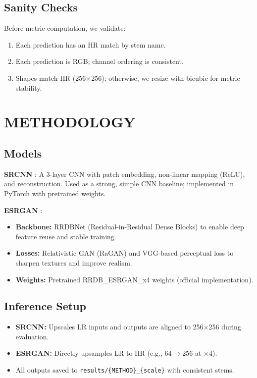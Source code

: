 \documentclass[]{spie}
\begin{document}
\subsection{Sanity Checks}
Before metric computation, we validate:
\begin{enumerate}
    \item Each prediction has an HR match by stem name.
    \item Each prediction is RGB; channel ordering is consistent.
    \item Shapes match HR (256$\times$256); otherwise, we resize with bicubic for metric stability.
\end{enumerate}

\section{METHODOLOGY}
\subsection{Models}
\textbf{SRCNN} \cite{dong2014learning}: A 3-layer CNN with patch embedding, non-linear mapping (ReLU), and reconstruction. Used as a strong, simple CNN baseline; implemented in PyTorch with pretrained weights.

\textbf{ESRGAN} \cite{wang2018esrgan}:
\begin{itemize}
    \item \textbf{Backbone:} RRDBNet (Residual-in-Residual Dense Blocks) to enable deep feature reuse and stable training.
    \item \textbf{Losses:} Relativistic GAN (RaGAN) and VGG-based perceptual loss to sharpen textures and improve realism.
    \item \textbf{Weights:} Pretrained RRDB\_ESRGAN\_x4 weights (official implementation).
\end{itemize}

\subsection{Inference Setup}
\begin{itemize}
  \item \textbf{SRCNN:} Upscales LR inputs and outputs are aligned to 256$\times$256 during evaluation.
  \item \textbf{ESRGAN:} Directly upsamples LR to HR (e.g., 64$\rightarrow$256 at $\times4$).
  \item All outputs saved to \texttt{results/\{METHOD\}\_\{scale\}} with consistent stems.
\end{itemize}
\end{document}
